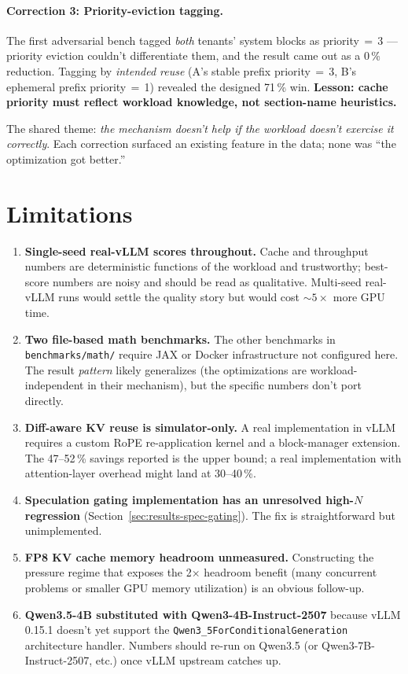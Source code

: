 \documentclass[11pt]{article}
\begin{document}
\paragraph{Correction 3: Priority-eviction tagging.}
The first adversarial bench tagged \emph{both} tenants' system
blocks as priority\,$=$\,3 --- priority eviction couldn't differentiate
them, and the result came out as a 0\,\% reduction. Tagging by
\emph{intended reuse} (A's stable prefix priority\,$=$\,3, B's
ephemeral prefix priority\,$=$\,1) revealed the designed 71\,\% win.
\textbf{Lesson: cache priority must reflect workload knowledge, not
section-name heuristics.}

\bigskip
The shared theme: \emph{the mechanism doesn't help if the workload
doesn't exercise it correctly}. Each correction surfaced an
existing feature in the data; none was ``the optimization got
better.''

\section{Limitations}
\label{sec:limitations}

\begin{enumerate}
\item \textbf{Single-seed real-vLLM scores throughout.} Cache and
  throughput numbers are deterministic functions of the workload and
  trustworthy; best-score numbers are noisy and should be read as
  qualitative. Multi-seed real-vLLM runs would settle the quality
  story but would cost $\sim 5\times$ more GPU time.
\item \textbf{Two file-based math benchmarks.} The other benchmarks
  in \verb|benchmarks/math/| require JAX or Docker infrastructure not
  configured here. The result \emph{pattern} likely generalizes (the
  optimizations are workload-independent in their mechanism), but the
  specific numbers don't port directly.
\item \textbf{Diff-aware KV reuse is simulator-only.} A real
  implementation in vLLM requires a custom RoPE re-application kernel
  and a block-manager extension. The 47--52\,\% savings reported is the
  upper bound; a real implementation with attention-layer overhead
  might land at 30--40\,\%.
\item \textbf{Speculation gating implementation has an unresolved
  high-$N$ regression} (Section~\ref{sec:results-spec-gating}). The
  fix is straightforward but unimplemented.
\item \textbf{FP8 KV cache memory headroom unmeasured.} Constructing
  the pressure regime that exposes the 2$\times$ headroom benefit
  (many concurrent problems or smaller GPU memory utilization) is an
  obvious follow-up.
\item \textbf{Qwen3.5-4B substituted with Qwen3-4B-Instruct-2507}
  because vLLM 0.15.1 doesn't yet support the
  \verb|Qwen3_5ForConditionalGeneration| architecture handler.
  Numbers should re-run on Qwen3.5 (or Qwen3-7B-Instruct-2507, etc.)
  once vLLM upstream catches up.
\end{enumerate}
\end{document}

